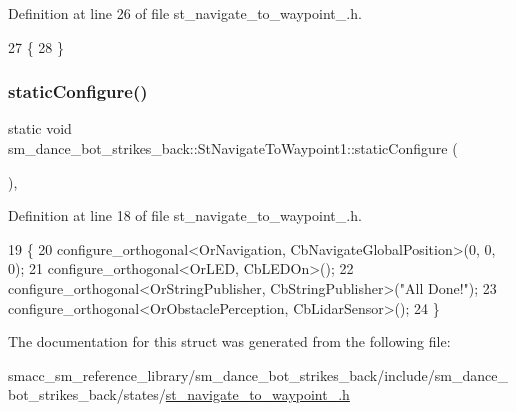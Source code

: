 Definition at line 26 of file st\+\_\+navigate\+\_\+to\+\_\+waypoint\+\_.\+h.


\begin{DoxyCode}
27   \{  
28   \}
\end{DoxyCode}
\mbox{\label{structsm__dance__bot__strikes__back_1_1StNavigateToWaypoint1_ae843a5387c40de95c1352b5f5790d8e7}} 
\subsubsection{\texorpdfstring{static\+Configure()}{staticConfigure()}}
{\footnotesize\ttfamily static void sm\+\_\+dance\+\_\+bot\+\_\+strikes\+\_\+back\+::\+St\+Navigate\+To\+Waypoint1\+::static\+Configure (\begin{DoxyParamCaption}{ }\end{DoxyParamCaption})\hspace{0.3cm}{\ttfamily [inline]}, {\ttfamily [static]}}



Definition at line 18 of file st\+\_\+navigate\+\_\+to\+\_\+waypoint\+\_.\+h.


\begin{DoxyCode}
19   \{
20     configure\_orthogonal<OrNavigation, CbNavigateGlobalPosition>(0, 0, 0);
21     configure\_orthogonal<OrLED, CbLEDOn>();
22     configure\_orthogonal<OrStringPublisher, CbStringPublisher>(\textcolor{stringliteral}{"All Done!"});
23     configure\_orthogonal<OrObstaclePerception, CbLidarSensor>();
24   \}
\end{DoxyCode}


The documentation for this struct was generated from the following file\+:\begin{DoxyCompactItemize}
\item 
smacc\+\_\+sm\+\_\+reference\+\_\+library/sm\+\_\+dance\+\_\+bot\+\_\+strikes\+\_\+back/include/sm\+\_\+dance\+\_\+bot\+\_\+strikes\+\_\+back/states/\hyperlink{strikes__back_2include_2sm__dance__bot__strikes__back_2states_2st__navigate__to__waypoint__1_8h}{st\+\_\+navigate\+\_\+to\+\_\+waypoint\+\_.\+h}\end{DoxyCompactItemize}
